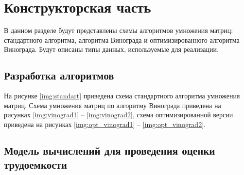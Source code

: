 \chapter{Конструкторская часть}

В данном разделе будут представлены схемы алгоритмов умножения матриц: стандартного алгоритма, алгоритма Винограда и оптимизированного алгоритма Винограда. Будут описаны типы данных, используемые для реализации.

\section{Разработка алгоритмов}

На рисунке \ref{img:standart} приведена схема стандартного алгоритма умножения матриц. 
Схема умножения матриц по алгоритму Винограда приведена на рисунках \ref{img:vinograd1} -- \ref{img:vinograd2}, схема оптимизированной версии приведена на рисунках \ref{img:opt_vinograd1} -- \ref{img:opt_vinograd2}.
\clearpage
{}
\clearpage

\section{Модель вычислений для проведения оценки трудоемкости}

